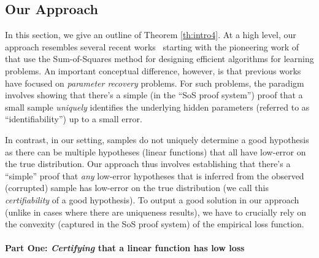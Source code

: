 \subsection{Our Approach} \label{sec:overview}
In this section, we give an outline of Theorem \ref{th:intro4}. At a high level, our approach resembles several recent works~\citep{DBLP:journals/corr/MaSS16,DBLP:conf/colt/BarakM16,DBLP:conf/colt/PotechinS17,DBLP:journals/corr/abs-1711-11581,HopkinsLi17} starting with the pioneering work of~\citet{MR3388192-Barak15} that use the Sum-of-Squares method for designing efficient algorithms for learning problems. An important conceptual difference, however, is that previous works have focused on \emph{parameter recovery} problems. For such problems, the paradigm involves showing that there's a simple (in the ``SoS proof system'') proof that a small sample \emph{uniquely} identifies the underlying hidden parameters (referred to as ``identifiability'') up to a small error.  

In contrast, in our setting, samples do not uniquely determine a good hypothesis as there can be multiple hypotheses (linear functions) that all have low-error on the true distribution. Our approach thus involves establishing that there's a ``simple'' proof that \emph{any} low-error hypotheses that is inferred from the observed (corrupted) sample has low-error on the true distribution (we call this \emph{certifiability} of a good hypothesis). To output a good solution in our approach (unlike in cases where there are uniqueness results), we have to crucially rely on the convexity (captured in the SoS proof system) of the empirical loss function.  %


\paragraph{Part One: \emph{Certifying} that a linear function has low loss}


